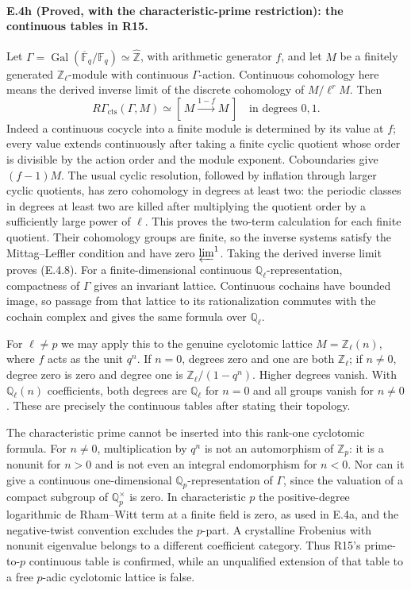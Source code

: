 \paragraph{E.4h (Proved, with the characteristic-prime restriction): the continuous tables in R15.}
Let $\Gamma=\operatorname{Gal}(\overline{\mathbb F}_q/\mathbb F_q)
\simeq\widehat{\mathbb Z}$, with arithmetic generator $f$, and let $M$
be a finitely generated $\mathbb Z_\ell$-module with continuous
$\Gamma$-action. Continuous cohomology here means the derived inverse
limit of the discrete cohomology of $M/\ell^rM$. Then
\[
 R\Gamma_{\mathrm{cts}}(\Gamma,M)
 \simeq[\,M\xrightarrow{1-f}M\,]
 \quad\text{in degrees }0,1.
 \tag{E.4.8}
\]
Indeed a continuous cocycle into a finite module is determined by its
value at $f$; every value extends continuously after taking a finite
cyclic quotient whose order is divisible by the action order and the
module exponent. Coboundaries give $(f-1)M$.
The usual cyclic resolution, followed by inflation through larger
cyclic quotients, has zero cohomology in degrees at least two: the
periodic classes in degrees at least two are killed after multiplying the
quotient order by a sufficiently large power of $\ell$.
This proves the two-term calculation for each finite quotient.
Their cohomology groups are finite, so the inverse systems satisfy
the Mittag--Leffler condition and have zero $\varprojlim^1$.
Taking the derived inverse limit proves (E.4.8).
For a finite-dimensional continuous $\mathbb Q_\ell$-representation,
compactness of $\Gamma$ gives an invariant lattice. Continuous cochains
have bounded image, so passage from that lattice to its rationalization
commutes with the cochain complex and gives the same formula over
$\mathbb Q_\ell$.

For $\ell\ne p$ we may apply this to the genuine cyclotomic lattice
$M=\mathbb Z_\ell(n)$, where $f$ acts as the unit $q^n$.
If $n=0$, degrees zero and one are both $\mathbb Z_\ell$; if $n\ne0$,
degree zero is zero and degree one is
$\mathbb Z_\ell/(1-q^n)$. Higher degrees vanish.
With $\mathbb Q_\ell(n)$ coefficients, both degrees are
$\mathbb Q_\ell$ for $n=0$ and all groups vanish for $n\ne0$.
These are precisely the continuous tables after stating their topology.

The characteristic prime cannot be inserted into this rank-one
cyclotomic formula. For $n\ne0$, multiplication by $q^n$ is not an
automorphism of $\mathbb Z_p$: it is a nonunit for $n>0$ and is not
even an integral endomorphism for $n<0$. Nor can it give a continuous
one-dimensional $\mathbb Q_p$-representation of $\Gamma$, since the
valuation of a compact subgroup of $\mathbb Q_p^\times$ is zero.
In characteristic $p$ the positive-degree logarithmic de Rham--Witt
term at a finite field is zero, as used in E.4a, and the negative-twist
convention excludes the $p$-part. A crystalline Frobenius with nonunit
eigenvalue belongs to a different coefficient category. Thus R15's
prime-to-$p$ continuous table is confirmed, while an unqualified
extension of that table to a free $p$-adic cyclotomic lattice is false.

